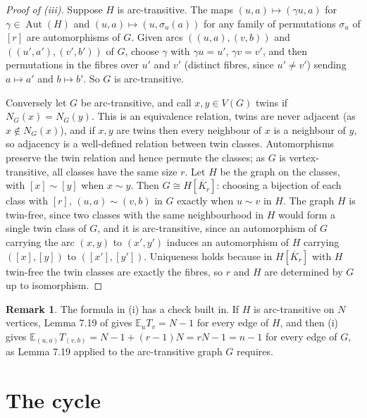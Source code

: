 \documentclass[11pt]{amsart}
\theoremstyle{definition}
\newtheorem{remark}[theorem]{Remark}
\newcommand{\E}{\mathbb{E}}
\newcommand{\Kbar}{\overline{K}}
\DeclareMathOperator{\Aut}{Aut}
\begin{document}
\begin{proof}[Proof of (iii)]
Suppose $H$ is arc-transitive. The maps $(u,a)\mapsto(\gamma u,a)$ for $\gamma\in\Aut(H)$ and $(u,a)\mapsto(u,\sigma_u(a))$ for any family of permutations $\sigma_u$ of $[r]$ are automorphisms of $G$. Given arcs $((u,a),(v,b))$ and $((u',a'),(v',b'))$ of $G$, choose $\gamma$ with $\gamma u=u'$, $\gamma v=v'$, and then permutations in the fibres over $u'$ and $v'$ (distinct fibres, since $u'\ne v'$) sending $a\mapsto a'$ and $b\mapsto b'$. So $G$ is arc-transitive.

Conversely let $G$ be arc-transitive, and call $x,y\in V(G)$ twins if $N_G(x)=N_G(y)$. This is an equivalence relation, twins are never adjacent (as $x\notin N_G(x)$), and if $x,y$ are twins then every neighbour of $x$ is a neighbour of $y$, so adjacency is a well-defined relation between twin classes. Automorphisms preserve the twin relation and hence permute the classes; as $G$ is vertex-transitive, all classes have the same size $r$. Let $H$ be the graph on the classes, with $[x]\sim[y]$ when $x\sim y$. Then $G\cong H[\Kbar_r]$: choosing a bijection of each class with $[r]$, $(u,a)\sim(v,b)$ in $G$ exactly when $u\sim v$ in $H$. The graph $H$ is twin-free, since two classes with the same neighbourhood in $H$ would form a single twin class of $G$, and it is arc-transitive, since an automorphism of $G$ carrying the arc $(x,y)$ to $(x',y')$ induces an automorphism of $H$ carrying $([x],[y])$ to $([x'],[y'])$. Uniqueness holds because in $H[\Kbar_r]$ with $H$ twin-free the twin classes are exactly the fibres, so $r$ and $H$ are determined by $G$ up to isomorphism.
\end{proof}

\begin{remark}
The formula in (i) has a check built in. If $H$ is arc-transitive on $N$ vertices, Lemma 7.19 of \cite{AF} gives $\E_uT_v=N-1$ for every edge of $H$, and then (i) gives $\E_{(u,a)}T_{(v,b)}=N-1+(r-1)N=rN-1=n-1$ for every edge of $G$, as Lemma 7.19 applied to the arc-transitive graph $G$ requires.
\end{remark}

\section{The cycle}\label{sec:cycle}
\end{document}
